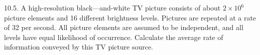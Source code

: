 \documentclass[a4]{beamer}
\begin{document}


\begin{frame}
10.5. A high-resolution black—and-white TV picture consists of about $2 \times 10^6$  picture elements and 16
different brightness levels. Pictures are repeated at a rate of 32 per second. All picture elements
are assumed to be independent, and all levels have equal likelihood of occurrence. Calculate the
average rate of information conveyed by this TV picture source.\\ \bigskip


\end{frame}
\end{document}
